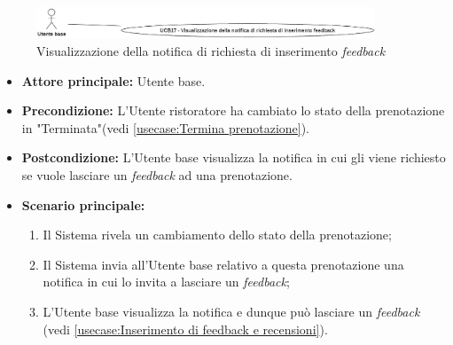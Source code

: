 \label{usecase:Visualizzazione della notifica di richiesta di inserimento feedback}

\begin{figure}[h]
	\centering
	\includegraphics[width=0.9\textwidth]{./uml/UCB17.png} 
	\caption{Visualizzazione della notifica di richiesta di inserimento \textit{feedback}}
	\label{fig:UCB17}
  \end{figure}

\begin{itemize}
	\item \textbf{Attore principale:} Utente base.


	\item \textbf{Precondizione:} L'Utente ristoratore ha cambiato lo stato della prenotazione in "Terminata"(vedi \autoref{usecase:Termina prenotazione}).


	\item \textbf{Postcondizione:} L'Utente base visualizza la notifica in cui
	      gli viene richiesto se vuole lasciare un \textit{feedback} ad una prenotazione.

	\item \textbf{Scenario principale:}
	      \begin{enumerate}
		      \item Il Sistema rivela un cambiamento dello stato della prenotazione;
		      \item Il Sistema invia all'Utente base relativo a questa prenotazione una notifica in cui lo invita a lasciare un \textit{feedback};
		      \item L'Utente base visualizza la notifica e dunque può lasciare un \textit{feedback} (vedi \autoref{usecase:Inserimento di feedback e recensioni}).
	      \end{enumerate}
\end{itemize}

